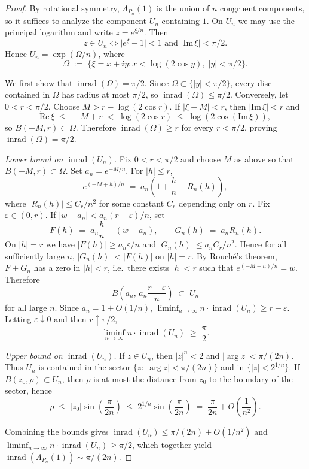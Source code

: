 \documentclass[11pt,a4paper]{amsart}
\theoremstyle{definition}
\newcommand{\abs}[1]{\lvert #1 \rvert}
\newcommand{\inrad}{\operatorname{inrad}}
\begin{document}
\begin{proof}
By rotational symmetry, $\Lambda_{P_n}(1)$ is the union of $n$ congruent
components, so it suffices to analyze the component $U_n$ containing $1$.
On $U_n$ we may use the principal logarithm and write $z = e^{\xi/n}$.
Then
\[
  z \in U_n \iff \abs{e^\xi - 1} < 1 \text{ and } \abs{\mathrm{Im}\,\xi} < \pi/2.
\]
Hence $U_n = \exp(\Omega/n)$, where
\[
  \Omega \;:=\; \{\xi = x + iy : x < \log(2\cos y),\; \abs{y} < \pi/2\}.
\]

We first show that $\inrad(\Omega) = \pi/2$.
Since $\Omega \subset \{\abs{y} < \pi/2\}$, every disc contained in $\Omega$
has radius at most $\pi/2$, so $\inrad(\Omega) \leq \pi/2$.
Conversely, let $0 < r < \pi/2$.  Choose $M > r - \log(2\cos r)$.
If $\abs{\xi + M} < r$, then $\abs{\mathrm{Im}\,\xi} < r$ and
\[
  \mathrm{Re}\,\xi \;\leq\; -M + r \;<\; \log(2\cos r)
  \;\leq\; \log(2\cos(\mathrm{Im}\,\xi)),
\]
so $B(-M, r) \subset \Omega$.  Therefore $\inrad(\Omega) \geq r$ for every
$r < \pi/2$, proving $\inrad(\Omega) = \pi/2$.

\emph{Lower bound on $\inrad(U_n)$.}
Fix $0 < r < \pi/2$ and choose $M$ as above so that
$B(-M, r) \subset \Omega$.  Set $a_n = e^{-M/n}$.
For $\abs{h} \leq r$,
\[
  e^{(-M+h)/n} \;=\; a_n\!\left(1 + \frac{h}{n} + R_n(h)\right),
\]
where $\abs{R_n(h)} \leq C_r/n^2$ for some constant $C_r$ depending
only on $r$.  Fix $\varepsilon \in (0, r)$.  If
$\abs{w - a_n} < a_n(r - \varepsilon)/n$, set
\[
  F(h) \;=\; a_n \frac{h}{n} - (w - a_n), \qquad
  G_n(h) \;=\; a_n R_n(h).
\]
On $\abs{h} = r$ we have $\abs{F(h)} \geq a_n \varepsilon/n$ and
$\abs{G_n(h)} \leq a_n C_r/n^2$.  Hence for all sufficiently large $n$,
$\abs{G_n(h)} < \abs{F(h)}$ on $\abs{h} = r$.
By Rouch\'{e}'s theorem, $F + G_n$ has a zero in $\abs{h} < r$, i.e.\
there exists $\abs{h} < r$ such that $e^{(-M+h)/n} = w$.  Therefore
\[
  B\!\left(a_n,\, a_n\frac{r - \varepsilon}{n}\right) \;\subset\; U_n
\]
for all large $n$.  Since $a_n = 1 + O(1/n)$,
$\liminf_{n \to \infty} n \cdot \inrad(U_n) \geq r - \varepsilon$.
Letting $\varepsilon \downarrow 0$ and then $r \uparrow \pi/2$,
\[
  \liminf_{n \to \infty} n \cdot \inrad(U_n) \;\geq\; \frac{\pi}{2}.
\]

\emph{Upper bound on $\inrad(U_n)$.}
If $z \in U_n$, then $\abs{z}^n < 2$ and $\abs{\arg z} < \pi/(2n)$.
Thus $U_n$ is contained in the sector
$\{z : \abs{\arg z} < \pi/(2n)\}$ and in $\{\abs{z} < 2^{1/n}\}$.
If $B(z_0, \rho) \subset U_n$, then $\rho$ is at most the distance from
$z_0$ to the boundary of the sector, hence
\[
  \rho \;\leq\; \abs{z_0}\sin\!\left(\frac{\pi}{2n}\right)
  \;\leq\; 2^{1/n}\sin\!\left(\frac{\pi}{2n}\right)
  \;=\; \frac{\pi}{2n} + O\!\left(\frac{1}{n^2}\right).
\]

Combining the bounds gives
$\inrad(U_n) \leq \pi/(2n) + O(1/n^2)$ and
$\liminf_{n \to \infty} n \cdot \inrad(U_n) \geq \pi/2$,
which together yield $\inrad(\Lambda_{P_n}(1)) \sim \pi/(2n)$.
\end{proof}
\end{document}
